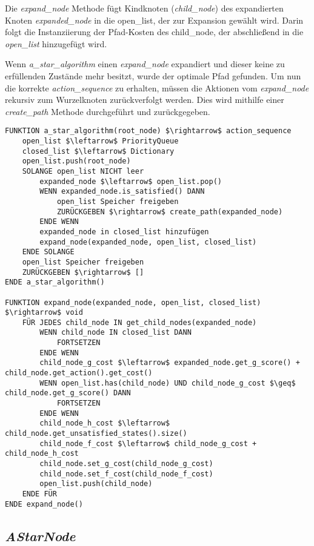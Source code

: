 Die \textit{expand\_node} Methode fügt Kindknoten (\textit{child\_node}) des expandierten Knoten \textit{expanded\_node} in die open\_list, der zur Expansion gewählt wird. Darin folgt die Instanziierung der Pfad-Kosten des child\_node, der abschlie\ss{}end in die \textit{open\_list} hinzugefügt wird.

Wenn \textit{a\_star\_algorithm} einen \textit{expand\_node} expandiert und dieser keine zu erfüllenden Zustände mehr besitzt, wurde der optimale Pfad gefunden. Um nun die korrekte \textit{action\_sequence} zu erhalten, müssen die Aktionen vom \textit{expand\_node} rekursiv zum Wurzelknoten zurückverfolgt werden. Dies wird mithilfe einer \textit{create\_path} Methode durchgeführt und zurückgegeben.

\begin{lstlisting}[language=Pseudo, caption={a\_star\_algorithm Methode}, mathescape=true, label={lst:pseudo astar}]
FUNKTION a_star_algorithm(root_node) $\rightarrow$ action_sequence
	open_list $\leftarrow$ PriorityQueue
	closed_list $\leftarrow$ Dictionary
	open_list.push(root_node)
	SOLANGE open_list NICHT leer
		expanded_node $\leftarrow$ open_list.pop()
		WENN expanded_node.is_satisfied() DANN
			open_list Speicher freigeben
			ZURÜCKGEBEN $\rightarrow$ create_path(expanded_node)
		ENDE WENN
		expanded_node in closed_list hinzufügen
		expand_node(expanded_node, open_list, closed_list)
	ENDE SOLANGE
	open_list Speicher freigeben
	ZURÜCKGEBEN $\rightarrow$ []
ENDE a_star_algorithm()

FUNKTION expand_node(expanded_node, open_list, closed_list) $\rightarrow$ void
	FÜR JEDES child_node IN get_child_nodes(expanded_node)
		WENN child_node IN closed_list DANN
			FORTSETZEN
		ENDE WENN
		child_node_g_cost $\leftarrow$ expanded_node.get_g_score() + child_node.get_action().get_cost()
		WENN open_list.has(child_node) UND child_node_g_cost $\geq$ child_node.get_g_score() DANN
			FORTSETZEN
		ENDE WENN
		child_node_h_cost $\leftarrow$ child_node.get_unsatisfied_states().size()
		child_node_f_cost $\leftarrow$ child_node_g_cost + child_node_h_cost
		child_node.set_g_cost(child_node_g_cost)
		child_node.set_f_cost(child_node_f_cost)
		open_list.push(child_node)
	ENDE FÜR
ENDE expand_node()
\end{lstlisting}










\subsection{\textit{AStarNode}}
\label{chap:astarnode uml}

